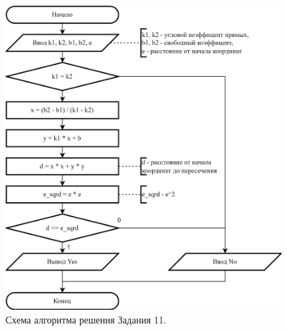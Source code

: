 \documentclass[oneside,a4paper,14pt]{extarticle}
\begin{document}
\begin{figure}
	\centering
	\includegraphics[width=0.95\textwidth]{img/11-scheme.png} %
	\caption{Схема алгоритма решения Задания 11.} %
\end{figure}
\end{document}
